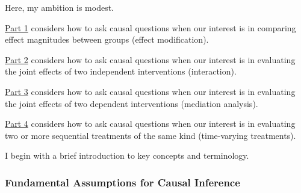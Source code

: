 \documentclass[
  single column]{article}
\begin{document}
Here, my ambition is modest.

\hyperref[id-sec-1]{Part 1} considers how to ask causal questions when
our interest is in comparing effect magnitudes between groups (effect
modification).

\hyperref[id-sec-2]{Part 2} considers how to ask causal questions when
our interest is in evaluating the joint effects of two independent
interventions (interaction).

\hyperref[id-sec-3]{Part 3} considers how to ask causal questions when
our interest is in evaluating the joint effects of two dependent
interventions (mediation analysis).

\hyperref[id-sec-4]{Part 4} considers how to ask causal questions when
our interest is in evaluating two or more sequential treatments of the
same kind (time-varying treatments).

I begin with a brief introduction to key concepts and terminology.

\subsubsection{Fundamental Assumptions for Causal
Inference}\label{fundamental-assumptions-for-causal-inference}
\end{document}
